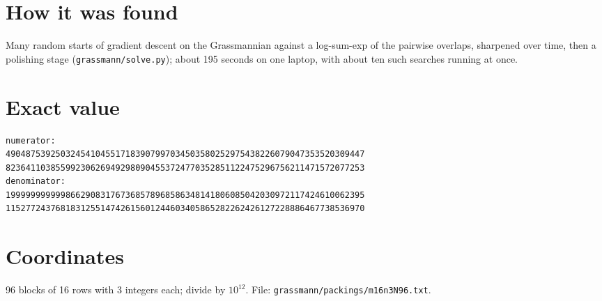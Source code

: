 \documentclass[11pt,a4paper]{article}
\begin{document}
\section{How it was found}
Many random starts of gradient descent on the Grassmannian against a log-sum-exp of the pairwise overlaps, sharpened over time, then a polishing stage (\texttt{grassmann/solve.py}); about 195 seconds on one laptop, with about ten such searches running at once.


\appendix
\section{Exact value}
{\small
\begin{verbatim}
numerator:
490487539250324541045517183907997034503580252975438226079047353520309447
823641103855992306269492980904553724770352851122475296756211471572077253
denominator:
199999999999866290831767368578968586348141806085042030972117424610062395
115277243768183125514742615601244603405865282262426127228886467738536970
\end{verbatim}}

\section{Coordinates}
96 blocks of 16 rows with 3 integers each; divide by $10^{12}$. File: \texttt{grassmann/packings/m16n3N96.txt}.
{\tiny
\begin{multicols}{3}
\end{multicols}}
\end{document}
